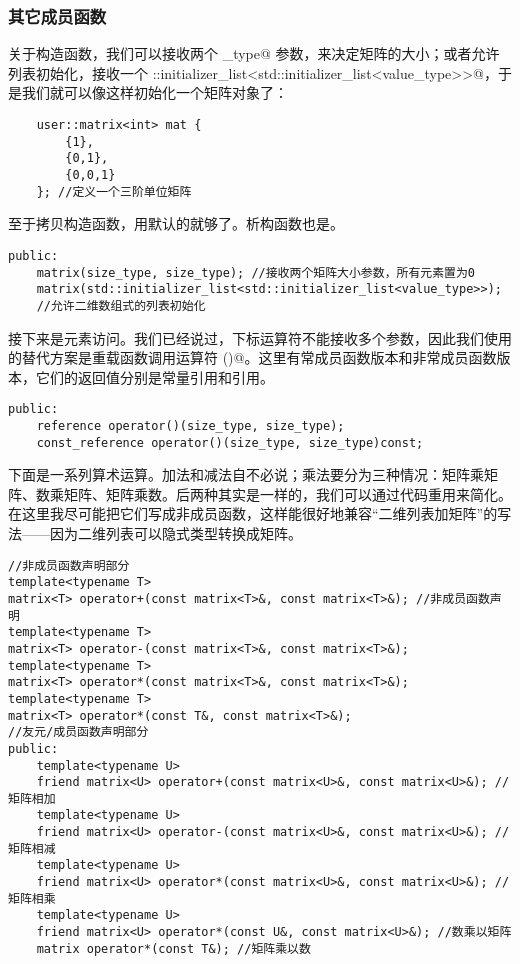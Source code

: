 \subsubsection*{其它成员函数}
关于构造函数，我们可以接收两个 \lstinline@size_type@ 参数，来决定矩阵的大小；或者允许列表初始化，接收一个 \lstinline@std::initializer_list<std::initializer_list<value_type>>@，于是我们就可以像这样初始化一个矩阵对象了：
\begin{lstlisting}
    user::matrix<int> mat {
        {1},
        {0,1},
        {0,0,1}
    }; //定义一个三阶单位矩阵
\end{lstlisting}
至于拷贝构造函数，用默认的就够了。析构函数也是。
\begin{lstlisting}
public:
    matrix(size_type, size_type); //接收两个矩阵大小参数，所有元素置为0
    matrix(std::initializer_list<std::initializer_list<value_type>>);
    //允许二维数组式的列表初始化
\end{lstlisting}\par
接下来是元素访问。我们已经说过，下标运算符不能接收多个参数，因此我们使用的替代方案是重载函数调用运算符 \lstinline@()@。这里有常成员函数版本和非常成员函数版本，它们的返回值分别是常量引用和引用。\par
\begin{lstlisting}
public:
    reference operator()(size_type, size_type);
    const_reference operator()(size_type, size_type)const;
\end{lstlisting}\par
下面是一系列算术运算。加法和减法自不必说；乘法要分为三种情况：矩阵乘矩阵、数乘矩阵、矩阵乘数。后两种其实是一样的，我们可以通过代码重用来简化。在这里我尽可能把它们写成非成员函数，这样能很好地兼容``二维列表加矩阵''的写法——因为二维列表可以隐式类型转换成矩阵。\par
\begin{lstlisting}
//非成员函数声明部分
template<typename T>
matrix<T> operator+(const matrix<T>&, const matrix<T>&); //非成员函数声明
template<typename T>
matrix<T> operator-(const matrix<T>&, const matrix<T>&);
template<typename T>
matrix<T> operator*(const matrix<T>&, const matrix<T>&);
template<typename T>
matrix<T> operator*(const T&, const matrix<T>&);
//友元/成员函数声明部分
public:
    template<typename U>
    friend matrix<U> operator+(const matrix<U>&, const matrix<U>&); //矩阵相加
    template<typename U>
    friend matrix<U> operator-(const matrix<U>&, const matrix<U>&); //矩阵相减
    template<typename U>
    friend matrix<U> operator*(const matrix<U>&, const matrix<U>&); //矩阵相乘
    template<typename U>
    friend matrix<U> operator*(const U&, const matrix<U>&); //数乘以矩阵
    matrix operator*(const T&); //矩阵乘以数
\end{lstlisting}
